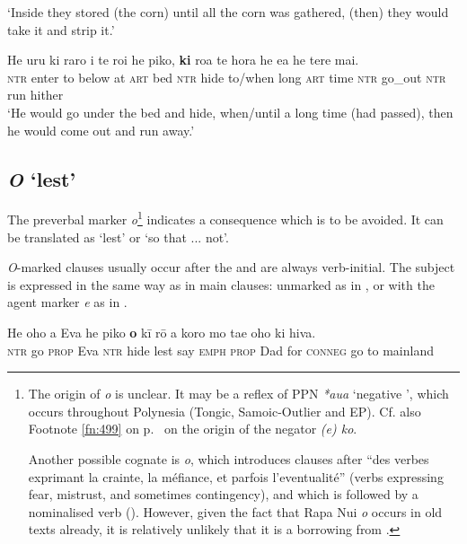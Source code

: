 \glt 
‘Inside they stored (the corn) until all the corn was gathered, (then) they would take it and strip it.’ \textstyleExampleref{[R250.068]} 
\z

\ea\label{ex:11.199}
\gll He uru ki raro i te ro{\ꞌ}i he piko, \textbf{ki} roa te hora he e{\ꞌ}a  he tere mai.\\
\textsc{ntr} enter to below at \textsc{art} bed \textsc{ntr} hide to/when long \textsc{art} time \textsc{ntr} go\_out  \textsc{ntr} run hither\\

\glt 
‘He would go under the bed and hide, when/until a long time (had passed), then he would come out and run away.’ \textstyleExampleref{[R250.185]} 
\z
{}

\subsection{\textit{{\ꞌ}O} ‘lest’}\label{sec:11.5.4}
The preverbal marker \textit{{\ꞌ}o}\footnote{\label{fn:527}The origin of \textit{{\ꞌ}o} is unclear. It may be a reflex of PPN \textit{*{\ꞌ}aua} ‘negative ’, which occurs throughout Polynesia (Tongic, Samoic-Outlier and EP). Cf. also Footnote \ref{fn:499} on p.~\pageref{fn:499} on the origin of the negator \textit{(e) ko}.

Another possible cognate is  \textit{{\ꞌ}o}, which introduces clauses after “des verbes exprimant la crainte, la méfiance, et parfois l’eventualité” (verbs expressing fear, mistrust, and sometimes contingency), and which is followed by a nominalised verb (\citealt[197]{AcadémieTahitienne1986}). However, given the fact that Rapa Nui \textit{{\ꞌ}o} occurs in old texts already, it is relatively unlikely that it is a borrowing from .} indicates a consequence which is to be avoided. It can be translated as ‘lest’ or ‘so that ... not’.

\textit{{\ꞌ}O}{}-marked clauses usually occur after the  and are always verb-initial. The subject is expressed in the same way as in main clauses: unmarked as in , or with the agent marker \textit{e} as in . 

\ea\label{ex:11.200}
\gll He oho a Eva he piko \textbf{{\ꞌ}o} kī rō a koro mo ta{\ꞌ}e oho ki hiva.\\
\textsc{ntr} go \textsc{prop} Eva \textsc{ntr} hide lest say \textsc{emph} \textsc{prop} Dad for \textsc{conneg} go to mainland\\

